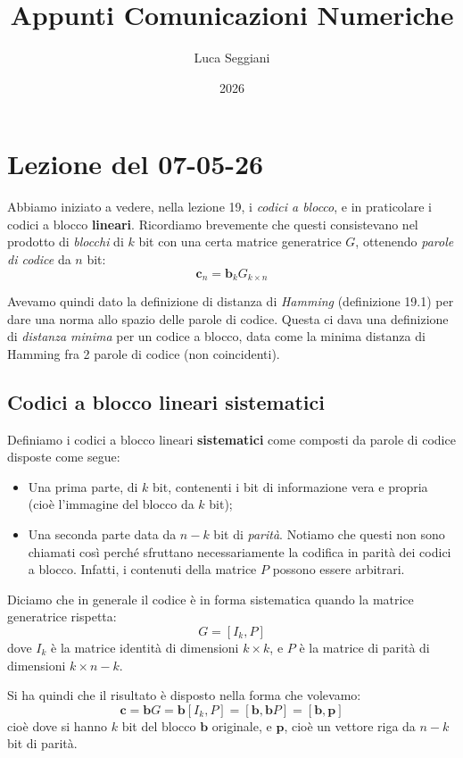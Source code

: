 \documentclass[a4paper,11pt]{article}
\title{Appunti Comunicazioni Numeriche}
\author{Luca Seggiani}
\date{2026}
\begin{document}
\section{Lezione del 07-05-26}

\thispagestyle{empty}
\pagestyle{fancy}

Abbiamo iniziato a vedere, nella lezione 19, i \textit{codici a blocco}, e in praticolare i codici a blocco \textbf{lineari}. Ricordiamo brevemente che questi consistevano nel prodotto di \textit{blocchi} di $k$ bit con una certa matrice generatrice $G$, ottenendo \textit{parole di codice} da $n$ bit:
$$
\mathbf{c}_n = \mathbf{b}_k G_{k \times n}
$$

Avevamo quindi dato la definizione di distanza di \textit{Hamming} (definizione 19.1) per dare una norma allo spazio delle parole di codice. Questa ci dava una definizione di \textit{distanza minima} per un codice a blocco, data come la minima distanza di Hamming fra 2 parole di codice (non coincidenti).

\subsection{Codici a blocco lineari sistematici}
Definiamo i codici a blocco lineari \textbf{sistematici} come composti da parole di codice disposte come segue:
\begin{itemize}
	\item Una prima parte, di $k$ bit, contenenti i bit di informazione vera e propria (cioè l'immagine del blocco da $k$ bit);
	\item Una seconda parte data da $n - k$ bit di \textit{parità}. Notiamo che questi non sono chiamati così perché sfruttano necessariamente la codifica in parità dei codici a blocco. Infatti, i contenuti della matrice $P$ possono essere arbitrari.
\end{itemize}

Diciamo che in generale il codice è in forma sistematica quando la matrice generatrice rispetta:
$$
G = [I_k, P]
$$
dove $I_k$ è la matrice identità di dimensioni $k \times k$, e $P$ è la matrice di parità di dimensioni $k \times n - k$.

Si ha quindi che il risultato è disposto nella forma che volevamo:
$$
\mathbf{c} = \mathbf{b} G = \mathbf{b} [I_k, P] = [\mathbf{b}, \mathbf{b} P] = [\mathbf{b}, \mathbf{p}]
$$
cioè dove si hanno $k$ bit del blocco $\mathbf{b}$ originale, e $\mathbf{p}$, cioè un vettore riga da $n - k$ bit di parità.
\end{document}
